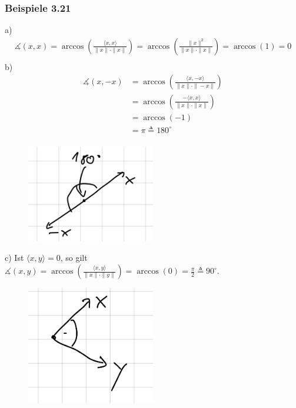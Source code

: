 \documentclass{article}
\begin{document}
\subsubsection*{Beispiele 3.21}
a) 
\begin{align*}
    \measuredangle (x,x) = \arccos \left( \frac{\langle x,x \rangle}{\|x\| \cdot \|x\|} \right) = \arccos \left( \frac{\|x\|^2}{\|x\| \cdot \|x\|} \right) = \arccos(1) = 0 \\
\end{align*}
b) 
\begin{align*}
    \measuredangle (x,-x) &= \arccos \left( \frac{\langle x,-x \rangle}{\|x\| \cdot \|-x\|} \right)\\
    &= \arccos \left( \frac{-\langle x,x \rangle}{\|x\| \cdot \|x\|} \right) \\
    &= \arccos(-1) \\
    &= \pi \triangleq 180^\circ \\
\end{align*}
\begin{figure}[h]
    \centering
    \includegraphics[width=0.5\textwidth]{Images/3.21b.jpeg}
    \caption{}
\end{figure}
c) 
Ist $\langle x,y \rangle = 0$, so gilt $\measuredangle (x,y) = \arccos \left( \frac{\langle x,y \rangle}{\|x\| \cdot \|y\|} \right) = \arccos(0) = \frac{\pi}{2} \triangleq 90^\circ$. \\
\begin{figure}[h]
    \centering
    \includegraphics[width=0.5\textwidth]{Images/3.21c.jpeg}
    \caption{}
\end{figure}
\\
\end{document}
